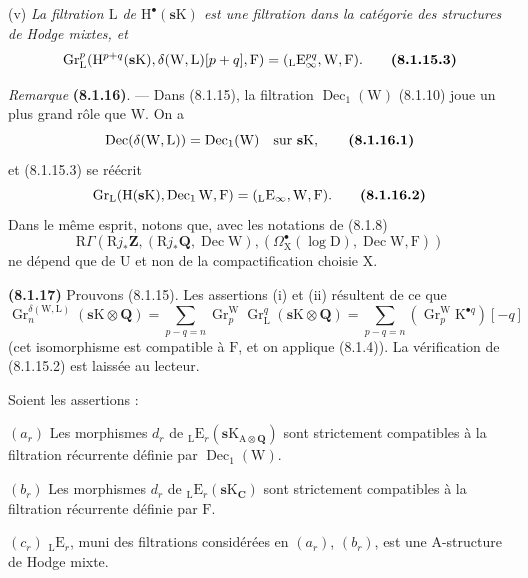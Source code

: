 \documentclass[11pt,leqno]{article}
\begin{document}
(v) \textit{La filtration \(\mathrm{L}\) de \(\mathrm{H}^{\bullet}(\mathbf{s}\mathrm{K})\) est une filtration dans la catégorie des structures de Hodge mixtes, et}
\[
\operatorname{Gr}_{\mathrm{L}}^{p}
(\mathrm{H}^{p+q}(\mathbf{s}\mathrm{K}),
\delta(\mathrm{W},\mathrm{L})[p+q],\mathrm{F})
=
({}_{\mathrm{L}}\mathrm{E}_{\infty}^{pq},\mathrm{W},\mathrm{F}).
\tag*{\textbf{(8.1.15.3)}}
\]

\textit{Remarque} \textbf{(8.1.16)}. — Dans (8.1.15), la filtration \(\operatorname{Dec}_{1}(\mathrm{W})\) (8.1.10) joue un plus grand rôle que \(\mathrm{W}\). On a
\[
\operatorname{Dec}(\delta(\mathrm{W},\mathrm{L}))
=
\operatorname{Dec}_{1}(\mathrm{W})
\quad\text{sur }\mathbf{s}\mathrm{K},
\tag*{\textbf{(8.1.16.1)}}
\]
et (8.1.15.3) se réécrit
\[
\operatorname{Gr}_{\mathrm{L}}
(\mathrm{H}(\mathbf{s}\mathrm{K}),\operatorname{Dec}_{1}\mathrm{W},\mathrm{F})
=
({}_{\mathrm{L}}\mathrm{E}_{\infty},\mathrm{W},\mathrm{F}).
\tag*{\textbf{(8.1.16.2)}}
\]
Dans le même esprit, notons que, avec les notations de (8.1.8)
\[
\mathrm{R}\Gamma
(\mathrm{R}j_{\ast}\mathbf{Z},
(\mathrm{R}j_{\ast}\mathbf{Q},\operatorname{Dec}\mathrm{W}),
(\Omega_{\mathrm{X}}^\bullet(\log\mathrm{D}),
\operatorname{Dec}\mathrm{W},\mathrm{F}))
\]
ne dépend que de \(\mathrm{U}\) et non de la compactification choisie \(\mathrm{X}\).

\textbf{(8.1.17)} Prouvons (8.1.15). Les assertions (i) et (ii) résultent de ce que
\[
\operatorname{Gr}_{n}^{\delta(\mathrm{W},\mathrm{L})}
(\mathbf{s}\mathrm{K}\otimes\mathbf{Q})
=
\sum_{p-q=n}
\operatorname{Gr}_{p}^{\mathrm{W}}\operatorname{Gr}_{\mathrm{L}}^{q}
(\mathbf{s}\mathrm{K}\otimes\mathbf{Q})
=
\sum_{p-q=n}
(\operatorname{Gr}_{p}^{\mathrm{W}}\mathrm{K}^{\bullet q})[-q]
\]
(cet isomorphisme est compatible à \(\mathrm{F}\), et on applique (8.1.4)). La vérification de (8.1.15.2) est laissée au lecteur.

Soient les assertions :

\((a_{r})\) Les morphismes \(d_{r}\) de \({}_{\mathrm{L}}\mathrm{E}_{r}(\mathbf{s}\mathrm{K}_{\mathrm{A}\otimes\mathbf{Q}})\) sont strictement compatibles à la filtration récurrente définie par \(\operatorname{Dec}_{1}(\mathrm{W})\).

\((b_{r})\) Les morphismes \(d_{r}\) de \({}_{\mathrm{L}}\mathrm{E}_{r}(\mathbf{s}\mathrm{K}_{\mathbf{C}})\) sont strictement compatibles à la filtration récurrente définie par \(\mathrm{F}\).

\((c_{r})\) \({}_{\mathrm{L}}\mathrm{E}_{r}\), muni des filtrations considérées en \((a_{r})\), \((b_{r})\), est une \(\mathrm{A}\)-structure de Hodge mixte.
\end{document}
